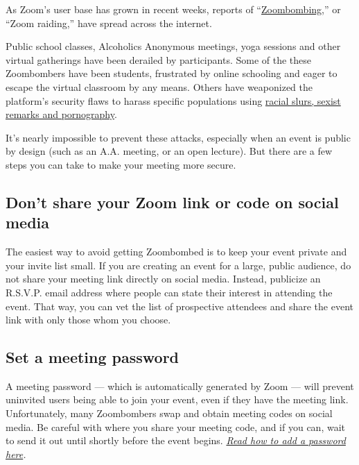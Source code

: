 As Zoom's user base has grown in recent weeks, reports of
``\href{https://www.nytimes3xbfgragh.onion/2020/03/20/style/zoombombing-zoom-trolling.html}{Zoombombing},''
or ``Zoom raiding,'' have spread across the internet.

Public school classes, Alcoholics Anonymous meetings, yoga sessions and
other virtual gatherings have been derailed by participants. Some of the
these Zoombombers have been students, frustrated by online schooling and
eager to escape the virtual classroom by any means. Others have
weaponized the platform's security flaws to harass specific populations
using
\href{https://www.nytimes3xbfgragh.onion/2020/04/03/technology/zoom-harassment-abuse-racism-fbi-warning.html}{racial
slurs, sexist remarks and pornography}.

It's nearly impossible to prevent these attacks, especially when an
event is public by design (such as an A.A. meeting, or an open lecture).
But there are a few steps you can take to make your meeting more secure.

\hypertarget{dont-share-your-zoom-link-or-code-on-social-media}{%
\subsection{Don't share your Zoom link or code on social
media}\label{dont-share-your-zoom-link-or-code-on-social-media}}

The easiest way to avoid getting Zoombombed is to keep your event
private and your invite list small. If you are creating an event for a
large, public audience, do not share your meeting link directly on
social media. Instead, publicize an R.S.V.P. email address where people
can state their interest in attending the event. That way, you can vet
the list of prospective attendees and share the event link with only
those whom you choose.

\hypertarget{set-a-meeting-password}{%
\subsection{Set a meeting password}\label{set-a-meeting-password}}

A meeting password --- which is automatically generated by Zoom --- will
prevent uninvited users being able to join your event, even if they have
the meeting link. Unfortunately, many Zoombombers swap and obtain
meeting codes on social media. Be careful with where you share your
meeting code, and if you can, wait to send it out until shortly before
the event begins.
\href{https://support.zoom.us/hc/en-us/articles/360033559832-Meeting-and-Webinar-Passwords-}{\emph{Read
how to add a password here}}\emph{.}

